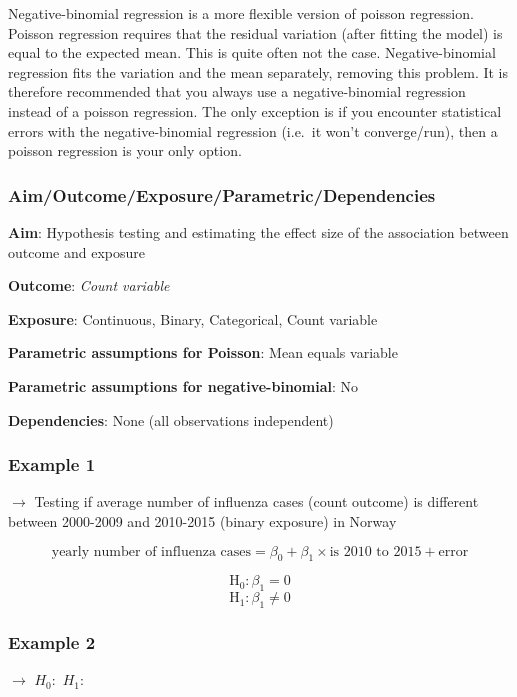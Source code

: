 \documentclass[12pt,]{article}
\begin{document}
Negative-binomial regression is a more flexible version of poisson
regression. Poisson regression requires that the residual variation
(after fitting the model) is equal to the expected mean. This is quite
often not the case. Negative-binomial regression fits the variation and
the mean separately, removing this problem. It is therefore recommended
that you always use a negative-binomial regression instead of a poisson
regression. The only exception is if you encounter statistical errors
with the negative-binomial regression (i.e.~it won't converge/run), then
a poisson regression is your only option.

\subsubsection{Aim/Outcome/Exposure/Parametric/Dependencies}\label{aimoutcomeexposureparametricdependencies-7}

\textbf{Aim}: Hypothesis testing and estimating the effect size of the
association between outcome and exposure

\textbf{Outcome}: \emph{Count variable}

\textbf{Exposure}: Continuous, Binary, Categorical, Count variable

\textbf{Parametric assumptions for Poisson}: Mean equals variable

\textbf{Parametric assumptions for negative-binomial}: No

\textbf{Dependencies}: None (all observations independent)

\subsubsection{Example 1}\label{example-1-8}

\(\rightarrow\) Testing if average number of influenza cases (count
outcome) is different between 2000-2009 and 2010-2015 (binary exposure)
in Norway

\[\text{yearly number of influenza cases} = \beta_0 + \beta_1 \times \text{is 2010 to 2015} + \text{error}\]

\[\text{H}_0: \beta_1 = 0\] \[\text{H}_1: \beta_1 \ne 0\]

\subsubsection{Example 2}\label{example-2-8}

\(\rightarrow\) \hfill \break
\hfill \break
\hfill \break
\hfill \break
\hfill \break
\hfill \break
\(H_0:\) \hfill \break
\hfill \break
\hfill \break
\(H_1:\)
\end{document}
